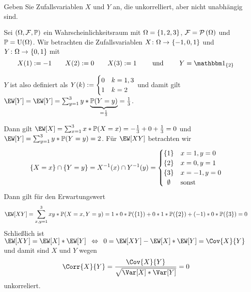 \begin{exercisePage}
	
	\begin{homework}
		Geben Sie Zufallsvariablen $X$ und $Y$ an, die unkorrelliert, aber nicht unabhängig sind.
	\end{homework}
	
	Sei $(\Omega, \mathcal{F}, \mathbb{P})$ ein Wahrscheinlichkeitsraum mit $\Omega = \left\{ 1,2,3 \right\}$, $\mathcal{F} = \mathcal{P}\left( \Omega \right)$ und $\mathbb{P} = \operatorname{U}(\Omega)$. Wir betrachten die Zufallsvariablen $\abb{X}{\Omega}{\menge{-1,0,1}}$ und $\abb{Y}{\Omega}{\menge{0,1}}$ mit
	\begin{equation*}
	X(1) \defeq -1 \qquad X(2) \defeq 0 \qquad X(3) \defeq 1 \qquad \und \qquad Y = \one_{\menge{2}}
	\end{equation*}
	\begin{correction}
		$Y$ ist also definiert als $Y(k) \mathrel{:=} \begin{cases} 0 & k = 1,3 \\ 1 & k=2 \end{cases}$ und damit gilt $\EW[Y] = \EW[Y] = \sum_{y=1}^3 y * \underbrace{\P(Y=y)}_{=\frac{1}{3}} = \frac{1}{3}$.
	\end{correction}
	Dann gilt $\EW[X] = \sum_{x = 1}^3 x * \P(X=x) = - \frac{1}{3} + 0 + \frac{1}{3} = 0$ und $\EW[Y] = \sum_{y=1}^3 y * \P(Y=y) = 2$. Für $\EW[XY]$ betrachten wir 
	\begin{equation*}
	\menge{X=x} \cap \menge{Y=y} = X^{-1}(x) \cap Y^{-1}(y) = \begin{cases}
	\menge{1} & x = 1 , y = 0 \\
	\menge{2} & x = 0 , y = 1 \\
	\menge{3} & x = -1 , y = 0 \\
	\phantom{\{} \emptyset \phantom{\}} & \text{sonst}
	\end{cases}
	\end{equation*}
	Dann gilt für den Erwartungswert
	\begin{equation*}
	\EW[XY] = \sum_{x,y = 1}^3 xy * \P(X=x , Y=y) = 1*0*\P(\menge{1}) + 0*1*\P(\menge{2}) + (-1) * 0 * \P(\menge{3}) = 0
	\end{equation*}
	Schließlich ist $\EW[XY] = \EW[X] * \EW[Y] \equivalent 0 = \EW[XY] - \EW[X] * \EW[Y] = \Cov{X}{Y}$ und damit sind $X$ und $Y$ wegen
	\begin{equation*}
		\Corr{X}{Y} = \frac{\Cov{X}{Y}}{\sqrt{\Var[X] * \Var[Y]}} = 0
	\end{equation*} 
	unkorreliert.
	

\end{exercisePage}
